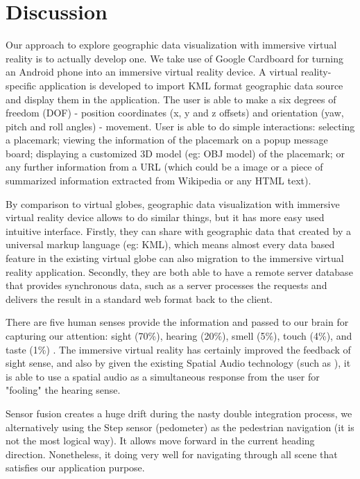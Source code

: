 \label{chapter-discussion}
\chapter{Discussion}

Our approach to explore geographic data visualization with immersive virtual reality is to actually develop one. We take use of Google Cardboard for turning an Android phone into an immersive virtual reality device. A virtual reality-specific application is developed to import KML format geographic data source and display them in the application. The user is able to make a six degrees of freedom (DOF) - position coordinates (x, y and z offsets) and orientation (yaw, pitch and roll angles) - movement. User is able to do simple interactions: selecting a placemark; viewing the information of the placemark on a popup message board; displaying a customized 3D model (eg: OBJ model) of the placemark; or any further information from a URL (which could be a image or a piece of summarized information extracted from Wikipedia or any HTML text).

By comparison to virtual globes, geographic data visualization with immersive virtual reality device allows to do similar things, but it has more easy used intuitive interface. Firstly, they can share with geographic data that created by a universal markup language (eg: KML), which means almost every data based feature in the existing virtual globe can also migration to the immersive virtual reality application. Secondly, they are both able to have a remote server database that provides synchronous data, such as a server processes the requests and delivers the result in a standard web format back to the client. 

There are five human senses provide the information and passed to our brain for capturing our attention: sight (70\%), hearing (20\%), smell (5\%), touch (4\%), and taste (1\%) \cite{mazuryk.vr.1996}. The immersive virtual reality has certainly improved the feedback of sight sense, and also by given the existing Spatial Audio technology (such as \cite{google.spatial-audio.2016}), it is able to use a spatial audio as a simultaneous response from the user for "fooling" the hearing sense.

Sensor fusion creates a huge drift during the nasty double integration process, we alternatively using the Step sensor (pedometer) as the pedestrian navigation (it is not the most logical way). It allows move forward in the current heading direction. Nonetheless, it doing very well for navigating through all scene that satisfies our application purpose.


